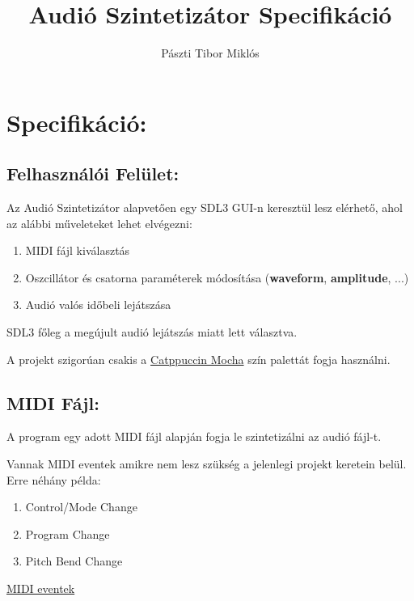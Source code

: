 \documentclass{article}
\begin{document}
\title{Audió Szintetizátor Specifikáció}
\author{Pászti Tibor Miklós}
\maketitle

\section{Specifikáció:}
\subsection{Felhasználói Felület:}
Az Audió Szintetizátor alapvetően egy SDL3 GUI-n keresztül lesz 
elérhető, ahol az alábbi műveleteket lehet elvégezni:

\begin{enumerate}
    \item {MIDI fájl kiválasztás} 
    \item {Oszcillátor és csatorna paraméterek módosítása (\textbf{waveform}, \textbf{amplitude}, ...)} 
    \item {Audió valós időbeli lejátszása} 
\end{enumerate}

\begin{cnote}[Megjegyzés:]
    SDL3 főleg a megújult audió lejátszás miatt lett választva.
\end{cnote}

\begin{cnote}[Megjegyzés:]
    A projekt szigorúan csakis a 
    \href{https://catppuccin.com/palette/}{Catppuccin Mocha}
    szín palettát fogja használni.
\end{cnote}

\subsection{MIDI Fájl:}
A program egy adott MIDI fájl alapján fogja le szintetizálni 
az audió fájl-t.

\begin{cnote}[Megjegyzés:]
    Vannak MIDI eventek amikre nem lesz szükség a jelenlegi
    projekt keretein belül. 
    Erre néhány példa:
    \begin{enumerate}
        \item{Control/Mode Change}
        \item{Program Change}
        \item{Pitch Bend Change}
    \end{enumerate}

    \href{https://midi.org/expanded-midi-1-0-messages-list}{MIDI eventek}
\end{cnote}
\end{document}
